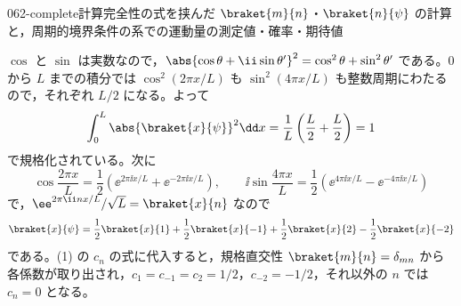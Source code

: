 \documentclass[uplatex,dvipdfmx,a4paper,11pt]{jsarticle}
\begin{document}
\begin{mondai}{062-complete}{計算}{完全性の式を挟んだ $\braket{m}{n}$・$\braket{n}{\psi}$ の計算と，周期的境界条件の系での運動量の測定値・確率・期待値}
\begin{tadashii}
 $\cos$ と $\sin$ は実数なので，$\abs{\cos\theta+\ii\sin\theta'}^{2}=\cos^{2}\theta+\sin^{2}\theta'$ である。$0$ から $L$ までの積分では $\cos^{2}(2\pi x/L)$ も $\sin^{2}(4\pi x/L)$ も整数周期にわたるので，それぞれ $L/2$ になる。よって
\[ \int_{0}^{L}\abs{\braket{x}{\psi}}^{2}\dd x=\frac{1}{L}\left(\frac{L}{2}+\frac{L}{2}\right)=1 \]
で規格化されている。次に
\[ \cos\frac{2\pi x}{L}=\frac{1}{2}\left(\ee^{2\pi\ii x/L}+\ee^{-2\pi\ii x/L}\right),\qquad \ii\sin\frac{4\pi x}{L}=\frac{1}{2}\left(\ee^{4\pi\ii x/L}-\ee^{-4\pi\ii x/L}\right) \]
で，$\ee^{2\pi\ii nx/L}/\sqrt{L}=\braket{x}{n}$ なので
\[ \braket{x}{\psi}=\frac{1}{2}\braket{x}{1}+\frac{1}{2}\braket{x}{-1}+\frac{1}{2}\braket{x}{2}-\frac{1}{2}\braket{x}{-2} \]
である。(1) の $c_{n}$ の式に代入すると，規格直交性 $\braket{m}{n}=\delta_{mn}$ から各係数が取り出され，$c_{1}=c_{-1}=c_{2}=1/2$，$c_{-2}=-1/2$，それ以外の $n$ では $c_{n}=0$ となる。


\end{tadashii}
\end{mondai}
\end{document}

